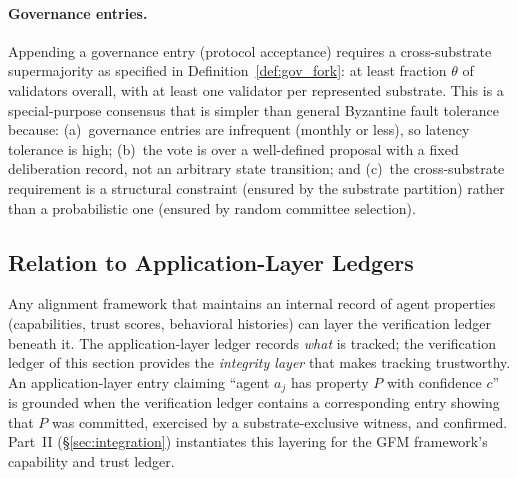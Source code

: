 \paragraph{Governance entries.}
Appending a governance entry (protocol acceptance) requires a
cross-substrate supermajority as specified in
Definition~\ref{def:gov_fork}: at least fraction $\theta$ of validators
overall, with at least one validator per represented substrate.  This is
a special-purpose consensus that is simpler than general Byzantine fault
tolerance because: (a)~governance entries are infrequent (monthly or
less), so latency tolerance is high; (b)~the vote is over a
well-defined proposal with a fixed deliberation record, not an
arbitrary state transition; and (c)~the cross-substrate requirement is a
structural constraint (ensured by the substrate partition) rather than a
probabilistic one (ensured by random committee selection).

\subsection{Relation to Application-Layer Ledgers}
\label{sec:harness_relation}

Any alignment framework that maintains an internal record of agent
properties (capabilities, trust scores, behavioral histories) can
layer the verification ledger beneath it.  The application-layer
ledger records \emph{what} is tracked; the verification ledger of
this section provides the \emph{integrity layer} that makes tracking
trustworthy.  An application-layer entry claiming ``agent $a_j$ has
property $P$ with confidence $c$'' is grounded when the verification
ledger contains a corresponding entry showing that $P$ was committed,
exercised by a substrate-exclusive witness, and confirmed.
Part~II (\S\ref{sec:integration}) instantiates this layering for
the GFM framework's capability and trust ledger.
